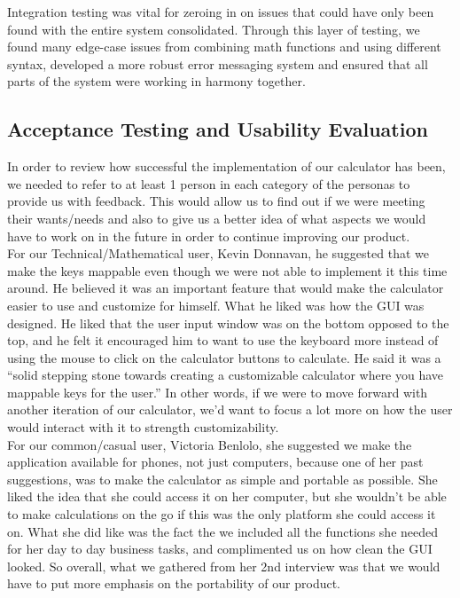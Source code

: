 \documentclass[a4paper, 12pt]{article}
\begin{document}
Integration testing was vital for zeroing in on issues that could have only been found with the entire system consolidated. Through this layer of testing, we found many edge-case issues from combining math functions and using different syntax, developed a more robust error messaging system and ensured that all parts of the system were working in harmony together.


\subsection{Acceptance Testing and Usability Evaluation}

In order to review how successful the implementation of our calculator has been, we needed to refer to at least 1 person in each category of the personas to provide us with feedback. This would allow us to find out if we were meeting their wants/needs and also to give us a better idea of what aspects we would have to work on in the future in order to continue improving our product.
\\

For our Technical/Mathematical user, Kevin Donnavan, he suggested that we make the keys mappable even though we were not able to implement it this time around. He believed it was an important feature that would make the calculator easier to use and customize for himself. What he liked was how the GUI was designed. He liked that the user input window was on the bottom opposed to the top, and he felt it encouraged him to want to use the keyboard more instead of using the mouse to click on the calculator buttons to calculate. He said it was a “solid stepping stone towards creating a customizable calculator where you have mappable keys for the user.” In other words, if we were to move forward with another iteration of our calculator, we’d want to focus a lot more on how the user would interact with it to strength customizability. 
\\

For our common/casual user, Victoria Benlolo, she suggested we make the application available for phones, not just computers, because one of her past suggestions, was to make the calculator as simple and portable as possible. She liked the idea that she could access it on her computer, but she wouldn’t be able to make calculations on the go if this was the only platform she could access it on. What she did like was the fact the we included all the functions she needed for her day to day business tasks, and complimented us on how clean the GUI looked. So overall, what we gathered from her 2nd interview was that we would have to put more emphasis on the portability of our product. 
\\
\end{document}
